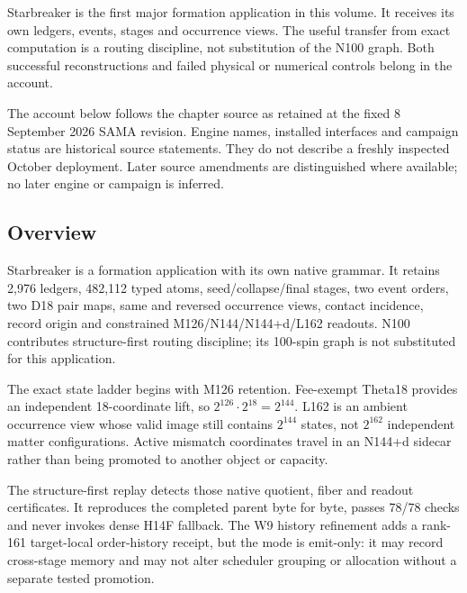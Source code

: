 \label{viii-ch08-starbreaker-formation-on-its-own-grammar}

Starbreaker is the first major formation application in this volume. It
receives its own ledgers, events, stages and occurrence views. The
useful transfer from exact computation is a routing discipline, not
substitution of the N100 graph. Both successful reconstructions and
failed physical or numerical controls belong in the account.

The account below follows the chapter source as retained at the fixed 8
September 2026 SAMA revision. Engine names, installed interfaces and
campaign status are historical source statements. They do not describe a
freshly inspected October deployment. Later source amendments are
distinguished where available; no later engine or campaign is inferred.

\subsection{Overview}\label{viii-ch08-overview}

Starbreaker is a formation application with its own native grammar. It
retains 2,976 ledgers, 482,112 typed atoms, seed/collapse/final stages,
two event orders, two D18 pair maps, same and reversed occurrence views,
contact incidence, record origin and constrained M126/N144/N144+d/L162
readouts. N100 contributes structure-first routing discipline; its
100-spin graph is not substituted for this application.

The exact state ladder begins with M126 retention. Fee-exempt Theta18
provides an independent 18-coordinate lift, so
\(2^{126}\cdot2^{18}=2^{144}\). L162 is an ambient occurrence view whose
valid image still contains \(2^{144}\) states, not \(2^{162}\)
independent matter configurations. Active mismatch coordinates travel in
an N144+d sidecar rather than being promoted to another object or
capacity.

The structure-first replay detects those native quotient, fiber and
readout certificates. It reproduces the completed parent byte for byte,
passes 78/78 checks and never invokes dense H14F fallback. The W9
history refinement adds a rank-161 target-local order-history receipt,
but the mode is emit-only: it may record cross-stage memory and may not
alter scheduler grouping or allocation without a separate tested
promotion.


